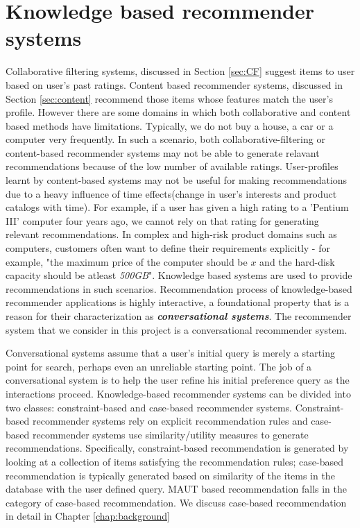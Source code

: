 \section{Knowledge based recommender systems}
Collaborative filtering systems, discussed in Section \ref{sec:CF} suggest items to user based on user's past ratings.
Content based recommender systems, discussed in Section \ref{sec:content} recommend those items whose features match the user's profile.
However there are some domains in which both collaborative and content based methods have limitations.
Typically, we do not buy a house, a car or a computer very frequently. 
In such a scenario, both collaborative-filtering or content-based recommender systems may not be able to generate relavant recommendations because of the low number of available ratings.
User-profiles learnt by content-based systems may not be useful for making recommendations due to a heavy influence of time effects(change in user's interests and product catalogs with time). 
For example, if a user has given a high rating to a 'Pentium III' computer four years ago, we cannot rely on that rating for generating relevant recommendations.
In complex and high-risk product domains such as computers, customers often want to define their requirements explicitly - for example, "the maximum price of the computer should be $x$ and the hard-disk capacity should be atleast \textit{500GB}".
Knowledge based systems are used to provide recommendations in such scenarios.
Recommendation process of knowledge-based recommender applications is highly interactive, a foundational property that is a reason for their characterization as \textit{\textbf{conversational systems}}. The recommender system that we consider in this project is a conversational recommender system.

Conversational systems assume that a user's initial query is merely a starting point for search, perhaps even an unreliable starting point. The job of a conversational system is to help the user refine his initial preference query as the interactions proceed.
Knowledge-based recommender systems can be divided into two classes: constraint-based and case-based recommender systems.
Constraint-based recommender systems rely on explicit recommendation rules and case-based recommender systems use similarity/utility measures to generate recommendations. 
Specifically, constraint-based recommendation is generated by looking at a collection of items satisfying the recommendation rules; case-based recommendation is typically generated based on similarity of the items in the database with the user defined query.
MAUT based recommendation falls in the category of case-based recommendation. We discuss case-based recommendation in detail in Chapter \ref{chap:background}

